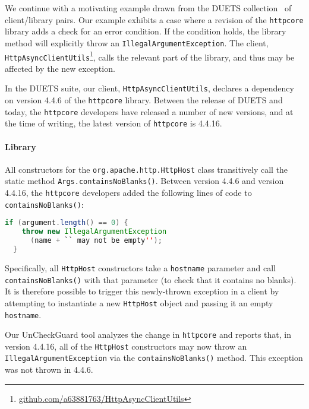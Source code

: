 We continue with a motivating example drawn from the DUETS collection~\cite{durieux21:_duets}
of client/library pairs. 
Our example exhibits a case
where a revision of the \texttt{httpcore} library adds a check for an
error condition.  If the condition holds, the library method will
explicitly throw an \texttt{IllegalArgumentException}. The client, \texttt{HttpAsyncClientUtils}\footnote{\url{github.com/a63881763/HttpAsyncClientUtils}},
calls the relevant part of the library, and thus may be affected by the new exception.

In the DUETS suite, our client, \texttt{HttpAsyncClientUtils}, declares a dependency on
version 4.4.6 of the \texttt{httpcore} library. Between the release of DUETS and today, the \texttt{httpcore} developers
have released a number of new versions, and at the time of writing, the latest version of \texttt{httpcore}
is 4.4.16.

\paragraph{Library} All constructors for the \texttt{org.apache.http.HttpHost} class transitively call
the static method \texttt{Args.containsNoBlanks()}. Between version 4.4.6 and version 4.4.16, the \texttt{httpcore}
developers added the following lines of code to \texttt{containsNoBlanks()}:
\begin{lstlisting}[language=Java]
  if (argument.length() == 0) {
    throw new IllegalArgumentException
      (name + `` may not be empty'');
  }
\end{lstlisting}
Specifically, all \texttt{HttpHost} constructors take a \texttt{hostname} parameter and call \texttt{containsNoBlanks()}
with that parameter (to check that it contains no blanks). It is therefore possible to trigger this newly-thrown
exception in a client by attempting to instantiate a new \texttt{HttpHost} object and passing it an empty
\texttt{hostname}.

Our UnCheckGuard tool analyzes the change in \texttt{httpcore} and reports that, in
version 4.4.16, all of the \texttt{HttpHost} constructors may now throw an
\texttt{IllegalArgumentException} via the \texttt{containsNoBlanks()} method.
This exception was not thrown in 4.4.6.

